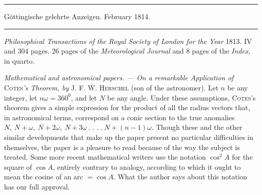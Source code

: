 \begin{center}
\rule{.85\textwidth}{.3pt}\par
Göttingische gelehrte Anzeigen. February 1814.\par
\rule{.85\textwidth}{.3pt}
\end{center}
\hspace*{\parindent}\textit{Philosophical Transactions of the Royal Society of London for the Year} 1813. IV and 304 pages. 26 pages of the \textit{Meteorological Journal} and 8 pages of the \textit{Index}, in quarto.

\textit{Mathematical and astronomical papers. --- On a remarkable Application of} \textsc{Cotes}\textit{'s Theorem, by} \textsc{J. F. W. Herschel} (son of the astronomer). Let \(n\) be any integer, let \(n\omega=360^0\), and let \(N\) be any angle. Under these assumptions, \textsc{Cotes}'s theorem gives a simple expression for the product of all the radius vectors that, in astronomical terms, correspond on a conic section to the true anomalies \(N,\ N+\omega,\ N+2\omega,\ N+3\omega\mathpunct{.}\mathpunct{.}\mathpunct{.}\mathpunct{.}N+(n-1)\omega\). Though these and the other similar developments that make up the paper present no particular difficulties in themselves, the paper is a pleasure to read because of the way the subject is treated. Some more recent mathematical writers use the notation \(\cos^2 A\) for the square of \(\cos A\), entirely contrary to analogy, according to which it ought to mean the cosine of an arc \(=\cos A\). What the author says about this notation has our full approval.

